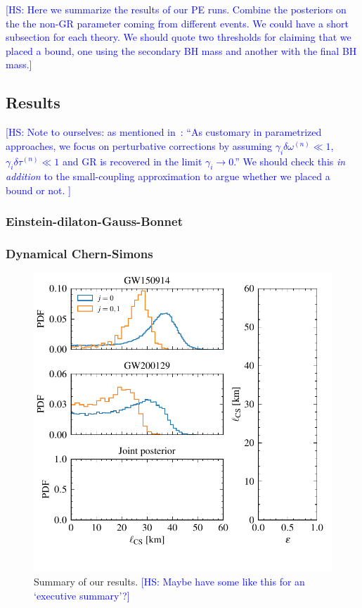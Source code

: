 \documentclass[twocolumn,prd,aps,superscriptaddress,preprintnumbers,tightenlines,showpacs,nofootinbib,eqsecnum,amsfonts,amsmath,longbibliography]{revtex4-1}
\newcommand{\hs}[1]{{\textcolor{blue}{{[HS: #1]}} }}
\begin{document}
\hs{Here we summarize the results of our PE runs. Combine the posteriors on the
the non-GR parameter coming from different events. We could have a short
subsection for each theory. We should quote two thresholds for claiming
that we placed a bound, one using the secondary BH mass and another with
the final BH mass.}

\subsection{Results}

\hs{Note to ourselves: as mentioned in~\cite{Maselli:2019mjd}:
%
``As customary in parametrized approaches, we focus on perturbative corrections by assuming $\gamma_{i} \delta \omega^{(n)} \ll 1$, $\gamma_{i} \delta \tau^{(n)} \ll 1$ and GR is recovered in the limit $\gamma_{i} \to 0$.''
We should check this \emph{in addition} to the small-coupling approximation to argue whether we placed a bound or not.
}

\subsubsection{Einstein-dilaton-Gauss-Bonnet}
\label{sec:results_edgb}

\subsubsection{Dynamical Chern-Simons}
\label{sec:results_dcs}

\begin{figure}[t]
\includegraphics[width=\columnwidth]{figs/posteriors_for_exs.pdf}
\caption{Summary of our results.
\hs{Maybe have some like this for an `executive summary'?}
}
\label{fig:dCS_exec_sum}
\end{figure}
\end{document}
